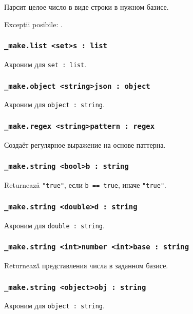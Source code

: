 Парсит целое число в виде строки в нужном базисе.

Excepții posibile: .

\subsubsection{\lstinline|_make.list <set>s : list|}

Акроним для \lstinline|set : list|.

\subsubsection{\lstinline|_make.object <string>json : object|}

Акроним для \lstinline|object : string|.

\subsubsection{\lstinline|_make.regex <string>pattern : regex|}

Создаёт регулярное выражение на основе паттерна.

\subsubsection{\lstinline|_make.string <bool>b : string|}

Returnează \lstinline|"true"|, если \lstinline|b == true|, иначе \lstinline|"true"|.

\subsubsection{\lstinline|_make.string <double>d : string|}

Акроним для \lstinline|double : string|.

\subsubsection{\lstinline|_make.string <int>number <int>base : string|}

Returnează представления числа в заданном базисе.

\subsubsection{\lstinline|_make.string <object>obj : string|}

Акроним для \lstinline|object : string|.

